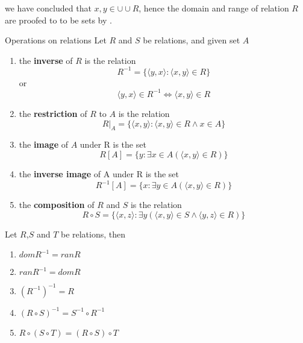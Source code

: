 \begin{remarks}
    we have concluded that $x, y \in \cup \cup R$, hence the domain and range of relation $R$ are proofed to to be sets by .
\end{remarks}

\begin{definition}{Operations on relations}{}
    Let $R$ and $S$ be relations, and given set $A$
    \begin{enumerate}

        \item the \textbf{inverse} of $R$ is the relation
        \begin{equation*}
            R^{-1} = \{\langle y,x \rangle : \langle x,y \rangle \in R\}
        \end{equation*}
        or
        \begin{equation*}
            \langle y,x \rangle \in R^{-1} \iff \langle x,y \rangle \in R
        \end{equation*}
        \item the \textbf{restriction} of $R$ to $A$ is the relation
        \begin{equation*}
            R \vert_{A} = \{\langle x,y \rangle : \langle x,y \rangle \in R \land x \in A\}
        \end{equation*}
        \item the \textbf{image} of $A$ under R is the set
        \begin{equation*}
            R[A] = \{y : \exists x \in A (\langle x,y \rangle \in R)\}
        \end{equation*}
        \item the \textbf{inverse image} of A under R is the set
        \begin{equation*}
            R^{-1}[A] = \{x : \exists y \in A(\langle x,y \rangle \in R)\}
        \end{equation*}
        \item the \textbf{composition} of $R$ and $S$ is the relation
        \begin{equation*}
            R \circ S = \{\langle x,z \rangle : \exists y (\langle x,y \rangle \in S \land \langle y,z \rangle \in R)\}
        \end{equation*}
    \end{enumerate}
\end{definition}

\begin{proposition}{}{}
    Let $R$,$S$ and $T$ be relations, then
    \begin{enumerate}

        \item $dom R^{-1} = ran R$
        \item $ran R^{-1} = dom R$
        \item $(R^{-1})^{-1} = R$ 
        \item $(R \circ S)^{-1} = S^{-1} \circ R^{-1}$
        \item $R \circ (S \circ T) = (R \circ S) \circ T$

    \end{enumerate}
\end{proposition}

